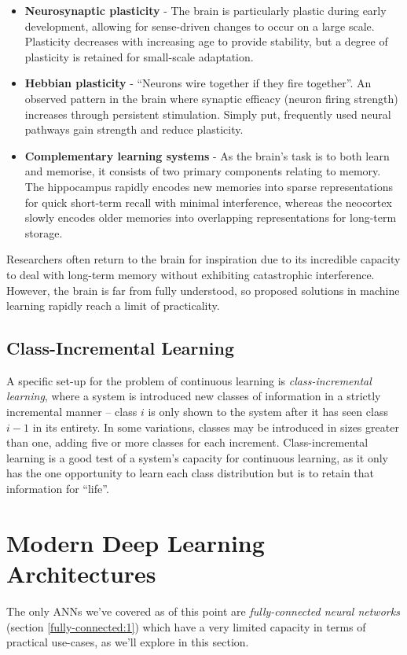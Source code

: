 \documentclass{report}
\begin{document}
\begin{itemize}
 \item\textbf{Neurosynaptic plasticity} - The brain is particularly plastic during early development, allowing for sense-driven changes to occur on a large scale. Plasticity decreases with increasing age to provide stability, but a degree of plasticity is retained for small-scale adaptation.
 \item\textbf{Hebbian plasticity}\parencite{hebbian}\label{hebbian:1} - ``Neurons wire together if they fire together''\parencite{wirefire}. An observed pattern in the brain where synaptic efficacy (neuron firing strength) increases through persistent stimulation. Simply put, frequently used neural pathways gain strength and reduce plasticity.
 \item\textbf{Complementary learning systems} - As the brain's task is to both learn and memorise, it consists of two primary components relating to memory. The hippocampus rapidly encodes new memories into sparse representations for quick short-term recall with minimal interference, whereas the neocortex slowly encodes older memories into overlapping representations for long-term storage.
\end{itemize}
Researchers often return to the brain for inspiration due to its incredible capacity to deal with long-term memory without exhibiting catastrophic interference. However, the brain is far from fully understood, so proposed solutions in machine learning rapidly reach a limit of practicality. \par

\subsection{Class-Incremental Learning} \label{cil}
A specific set-up for the problem of continuous learning is \emph{class-incremental learning}, where a system is introduced new classes of information in a strictly incremental manner -- class $i$ is only shown to the system after it has seen class $i-1$ in its entirety. In some variations, classes may be introduced in sizes greater than one, adding five or more classes for each increment. Class-incremental learning is a good test of a system's capacity for continuous learning, as it only has the one opportunity to learn each class distribution but is to retain that information for ``life''. \par

\section{Modern Deep Learning Architectures} \label{modern-dl:1}
The only ANNs we've covered as of this point are \textit{fully-connected neural networks} (section \ref{fully-connected:1}) which have a very limited capacity in terms of practical use-cases, as we'll explore in this section. \par
\end{document}
